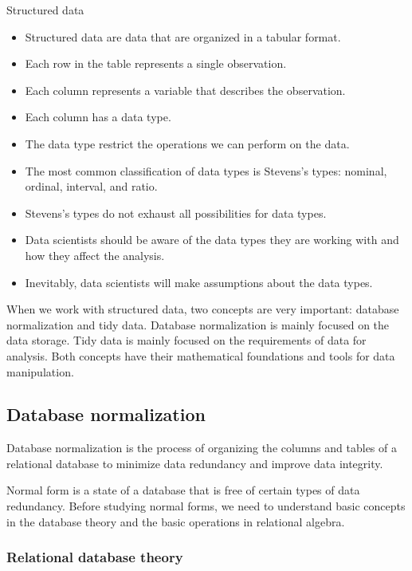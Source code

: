 \begin{slidebox}{Structured data}{}
  \begin{itemize}
    \item Structured data are data that are organized in a tabular format.
    \item Each row in the table represents a single observation.
    \item Each column represents a variable that describes the observation.
    \item Each column has a data type.
    \item The data type restrict the operations we can perform on the data.
    \item The most common classification of data types is Stevens’s types: nominal,
      ordinal, interval, and ratio.
    \item Stevens’s types do not exhaust all possibilities for data types.
    \item Data scientists should be aware of the data types they are working with and
      how they affect the analysis.
    \item Inevitably, data scientists will make assumptions about the data types.
  \end{itemize}
\end{slidebox}

When we work with structured data, two concepts are very important: database normalization
and tidy data.  Database normalization is mainly focused on the data storage.  Tidy data is
mainly focused on the requirements of data for analysis.  Both concepts have their
mathematical foundations and tools for data manipulation.

\subsection{Database normalization}

Database normalization is the process of organizing the columns and tables of a relational
database to minimize data redundancy and improve data integrity.

Normal form is a state of a database that is free of certain types of data redundancy.
Before studying normal forms, we need to understand basic concepts in the database theory
and the basic operations in relational algebra.

\subsubsection{Relational database theory}


